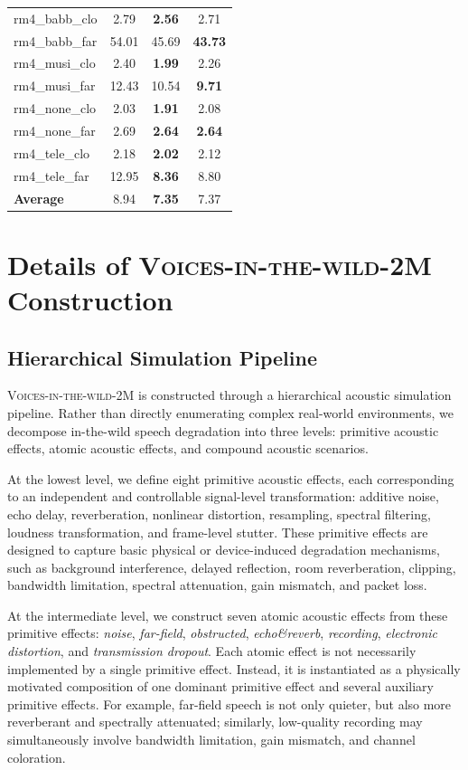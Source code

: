 \documentclass{article}
\begin{document}
\begin{table}[t]
{\begin{tabular}{lccc}
\midrule
rm4\_babb\_clo & 2.79 & \textbf{2.56} & 2.71 \\
rm4\_babb\_far & 54.01 & 45.69 & \textbf{43.73} \\
rm4\_musi\_clo & 2.40 & \textbf{1.99} & 2.26 \\
rm4\_musi\_far & 12.43 & 10.54 & \textbf{9.71} \\
rm4\_none\_clo & 2.03 & \textbf{1.91} & 2.08 \\
rm4\_none\_far & 2.69 & \textbf{2.64} & \textbf{2.64} \\
rm4\_tele\_clo & 2.18 & \textbf{2.02} & 2.12 \\
rm4\_tele\_far & 12.95 & \textbf{8.36} & 8.80 \\
\midrule
\textbf{Average} & 8.94 & \textbf{7.35} & 7.37 \\
\bottomrule
\end{tabular}
}
\vspace{-2mm}
\end{table}

\newpage
\section{Details of  \textsc{Voices-in-the-wild-2M}  Construction}
\label{app:data_construction}

\subsection{Hierarchical Simulation Pipeline}

 \textsc{Voices-in-the-wild-2M}  is constructed through a hierarchical acoustic simulation
pipeline. Rather than directly enumerating complex real-world environments, we
decompose in-the-wild speech degradation into three levels: primitive acoustic
effects, atomic acoustic effects, and compound acoustic scenarios.

At the lowest level, we define eight primitive acoustic effects, each
corresponding to an independent and controllable signal-level transformation:
additive noise, echo delay, reverberation, nonlinear distortion, resampling,
spectral filtering, loudness transformation, and frame-level stutter. These
primitive effects are designed to capture basic physical or device-induced
degradation mechanisms, such as background interference, delayed reflection,
room reverberation, clipping, bandwidth limitation, spectral attenuation, gain
mismatch, and packet loss.

At the intermediate level, we construct seven atomic acoustic effects from these
primitive effects: \textit{noise}, \textit{far-field}, \textit{obstructed},
\textit{echo\&reverb}, \textit{recording}, \textit{electronic distortion}, and
\textit{transmission dropout}. Each atomic effect is not necessarily implemented
by a single primitive effect. Instead, it is instantiated as a physically
motivated composition of one dominant primitive effect and several auxiliary
primitive effects. For example, far-field speech is not only quieter, but also
more reverberant and spectrally attenuated; similarly, low-quality recording may
simultaneously involve bandwidth limitation, gain mismatch, and channel
coloration.
\end{document}
